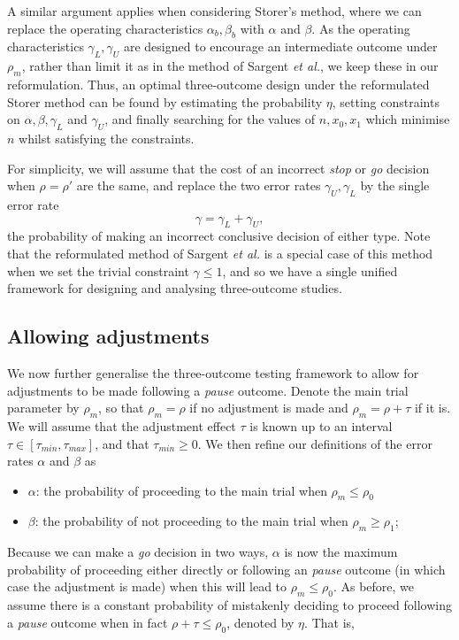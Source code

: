 \documentclass{bmcart}
\begin{document}
A similar argument applies when considering Storer's method, where we can replace the operating characteristics $\alpha_b, \beta_b$ with $\alpha$ and $\beta$. As the operating characteristics $\gamma_L, \gamma_U$ are designed to encourage an intermediate outcome under $\rho_m$, rather than limit it as in the method of Sargent \emph{et al.}, we keep these in our reformulation. Thus, an optimal three-outcome design under the reformulated Storer method can be found by estimating the probability $\eta$, setting constraints on $\alpha, \beta, \gamma_L$ and $\gamma_U$, and finally searching for the values of  $n, x_0, x_1$ which minimise $n$ whilst satisfying the constraints. 

For simplicity, we will assume that the cost of an incorrect \emph{stop} or \emph{go} decision when $\rho = \rho'$ are the same, and replace the two error rates $\gamma_U, \gamma_L$ by the single error rate
$$
\gamma = \gamma_L + \gamma_U,
$$
the probability of making an incorrect conclusive decision of either type. Note that the reformulated method of Sargent \emph{et al.} is a special case of this method when we set the trivial constraint $\gamma \leq 1$, and so we have a single unified framework for designing and analysing three-outcome studies.

\subsection{Allowing adjustments}\label{sec:adjustments}

We now further generalise the three-outcome testing framework to allow for adjustments to be made following a \emph{pause} outcome. Denote the main trial parameter by $\rho_m$, so that $\rho_m = \rho$ if no adjustment is made and $\rho_m  = \rho + \tau$ if it is. We will assume that the adjustment effect $\tau$ is known up to an interval $\tau \in [\tau_{min}, \tau_{max}]$, and that $\tau_{min} \geq 0$. We then refine our definitions of the error rates $\alpha$ and $\beta$ as

\begin{itemize}
\item $\alpha$: the probability of proceeding to the main trial when $\rho_m \leq \rho_0$
\item $\beta$: the probability of not proceeding to the main trial when $\rho_m \geq \rho_1$;
\end{itemize}

Because we can make a \emph{go} decision in two ways, $\alpha$ is now the maximum probability of proceeding either directly or following an \emph{pause} outcome (in which case the adjustment is made) when this will lead to $\rho_m \leq \rho_0$. As before, we assume there is a constant probability of mistakenly deciding to proceed following a \emph{pause} outcome when in fact $\rho + \tau \leq \rho_0$, denoted  by $\eta$. That is,
\end{document}
